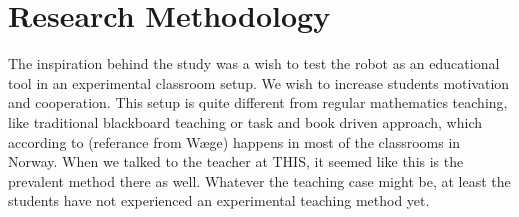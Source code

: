 \chapter{Research Methodology}
The inspiration behind the study was a wish to test the robot as an educational tool in an experimental classroom setup. We wish to increase students motivation and cooperation. This setup is quite different from regular mathematics teaching, like traditional blackboard teaching or task and book driven approach, which according to (referance from W\ae ge) happens in most of the classrooms in Norway. When we talked to the teacher at THIS, it seemed like this is the prevalent method there as well. Whatever the teaching case might be, at least the students have not experienced an experimental teaching method yet.





